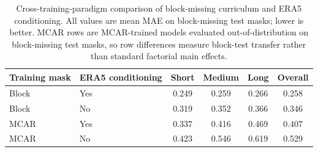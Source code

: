 \begin{table}[t]
  \centering
  \caption{Cross-training-paradigm comparison of block-missing curriculum and ERA5 conditioning. All values are mean MAE on block-missing test masks; lower is better. MCAR rows are MCAR-trained models evaluated out-of-distribution on block-missing test masks, so row differences measure block-test transfer rather than standard factorial main effects.}
  \label{tab:curriculum-era5-factorial}
  \begin{tabular}{llcccc}
    \toprule
    Training mask & ERA5 conditioning & Short & Medium & Long & Overall \\
    \midrule
    Block & Yes & 0.249 & 0.259 & 0.266 & 0.258 \\
    Block & No & 0.319 & 0.352 & 0.366 & 0.346 \\
    MCAR & Yes & 0.337 & 0.416 & 0.469 & 0.407 \\
    MCAR & No & 0.423 & 0.546 & 0.619 & 0.529 \\
    \bottomrule
  \end{tabular}
\end{table}
